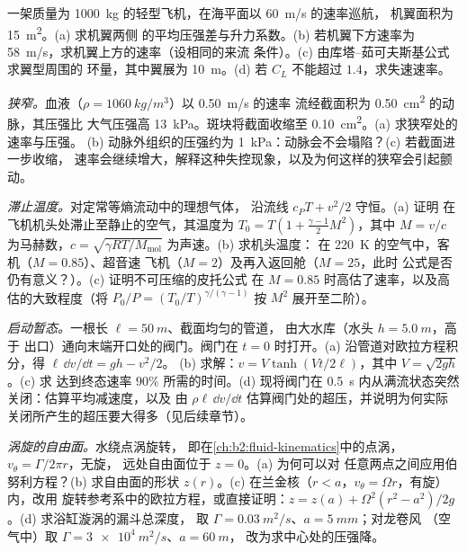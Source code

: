 \begin{exercise}[$\star\star$]\label{exo:b2:euler-bernoulli:8}
一架质量为 \qty{1000}{kg} 的轻型飞机，在海平面以 \qty{60}{m/s} 的速率巡航，
机翼面积为 \qty{15}{m^2}。(a) 求机翼两侧
的平均压强差与升力系数。(b) 若机翼下方速率为
\qty{58}{m/s}，求机翼上方的速率（设相同的来流
条件）。(c) 由库塔–茹可夫斯基公式求翼型周围的
环量，其中翼展为 \qty{10}{m}。(d) 若
$C_L$ 不能超过 $1.4$，求失速速率。
\end{exercise}

\begin{exercise}[$\star\star$]\label{exo:b2:euler-bernoulli:9}
\emph{狭窄。}血液（$\rho = \qty{1060}{kg/m^3}$）以 \qty{0.50}{m/s} 的速率
流经截面积为 \qty{0.50}{cm^2} 的动脉，其压强比
大气压强高 \qty{13}{kPa}。斑块将截面收缩至 \qty{0.10}{cm^2}。(a) 求狭窄处的速率与压强。
(b) 动脉外组织的压强约为
\qty{1}{kPa}：动脉会不会塌陷？(c) 若截面进一步收缩，
速率会继续增大，解释这种失控现象，以及为何这样的狭窄会引起颤动。
\end{exercise}

\begin{exercise}[$\star\star\star$]\label{exo:b2:euler-bernoulli:10}
\emph{滞止温度。}对定常等熵流动中的理想气体，
沿流线 $c_PT + v^2/2$ 守恒。(a) 证明
在飞机机头处滞止至静止的空气，其温度为 $T_0 = T(1 +
\tfrac{\gamma - 1}{2}M^2)$，其中 $M = v/c$ 为马赫数，$c =
\sqrt{\gamma RT/M_{\text{mol}}}$ 为声速。(b) 求机头温度：
在 \qty{220}{K} 的空气中，客机（$M = 0.85$）、超音速
飞机（$M = 2$）及再入返回舱（$M = 25$，此时
公式是否仍有意义？）。(c) 证明不可压缩的皮托公式
在 $M = 0.85$ 时高估了速率，以及高估的大致程度（将
$P_0/P = (T_0/T)^{\gamma/(\gamma - 1)}$ 按 $M^2$ 展开至二阶）。
\end{exercise}

\begin{exercise}[$\star\star\star$]\label{exo:b2:euler-bernoulli:11}
\emph{启动暂态。}一根长 $\ell = \qty{50}{m}$、截面均匀的管道，
由大水库（水头 $h = \qty{5.0}{m}$，高于
出口）通向末端开口处的阀门。阀门在 $t = 0$ 时打开。(a)
沿管道对欧拉方程积分，得 $\ell\,\dd v/\dd t = gh - v^2/2$。
(b) 求解：$v = V\tanh(Vt/2\ell)$，其中 $V = \sqrt{2gh}$。(c) 求
达到终态速率 $90\%$ 所需的时间。(d) 现将阀门在
\qty{0.5}{s} 内从满流状态突然关闭：估算平均减速度，以及
由 $\rho\ell\,\dd v/\dd t$ 估算阀门处的超压，并说明为何实际
关闭所产生的超压要大得多（见后续章节）。
\end{exercise}

\begin{exercise}[$\star\star\star$]\label{exo:b2:euler-bernoulli:12}
\emph{涡旋的自由面。}水绕点涡旋转，
即在\cref{ch:b2:fluid-kinematics}中的点涡，$v_\theta = \Gamma/2\pi r$，无旋，
远处自由面位于 $z = 0$。(a) 为何可以对
任意两点之间应用伯努利方程？(b) 求自由面的形状 $z(r)$。(c)
在兰金核（$r < a$，$v_\theta = \Omega r$，有旋）内，改用
旋转参考系中的欧拉方程，或直接证明：$z = z(a) +
\Omega^2(r^2 - a^2)/2g$。(d) 求浴缸漩涡的漏斗总深度，
取 $\Gamma = \qty{0.03}{m^2/s}$、$a = \qty{5}{mm}$；对龙卷风
（空气中）取 $\Gamma = \qty{3e4}{m^2/s}$、$a = \qty{60}{m}$，
改为求中心处的压强降。
\end{exercise}

